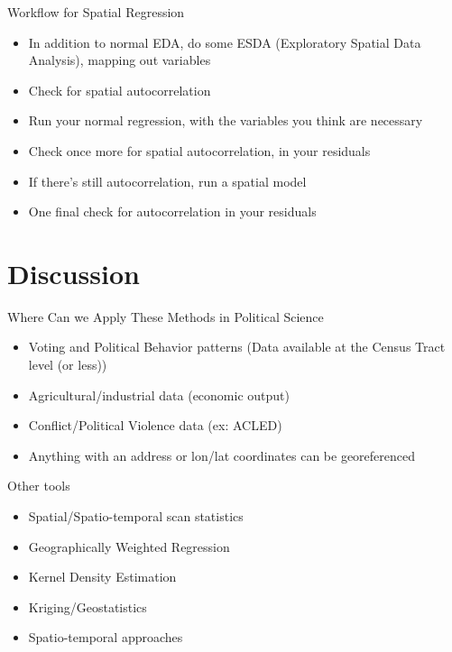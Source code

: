 \documentclass[aspectratio = 169, 12pt]{beamer}\usepackage[]{graphicx}\usepackage[]{color}
\begin{document}
\begin{frame}{Workflow for Spatial Regression}
\begin{itemize}
\item In addition to normal EDA, do some ESDA (Exploratory Spatial Data Analysis), mapping out variables
\item Check for spatial autocorrelation
\item Run your normal regression, with the variables you think are necessary
\item Check once more for spatial autocorrelation, in your residuals
\item If there's still autocorrelation, run a spatial model
\item One final check for autocorrelation in your residuals
\end{itemize}
\end{frame}

\section{Discussion}
\begin{frame}{Where Can we Apply These Methods in Political Science}
\begin{itemize}
\item Voting and Political Behavior patterns (Data available at the Census Tract level (or less))
\item Agricultural/industrial data (economic output)
\item Conflict/Political Violence data (ex: ACLED)
\item Anything with an address or lon/lat coordinates can be georeferenced
\end{itemize}
\end{frame}

\begin{frame}{Other tools}
\begin{itemize}
\item Spatial/Spatio-temporal scan statistics
\item Geographically Weighted Regression
\item Kernel Density Estimation
\item Kriging/Geostatistics
\item Spatio-temporal approaches
\end{itemize}
\end{frame}
\end{document}
